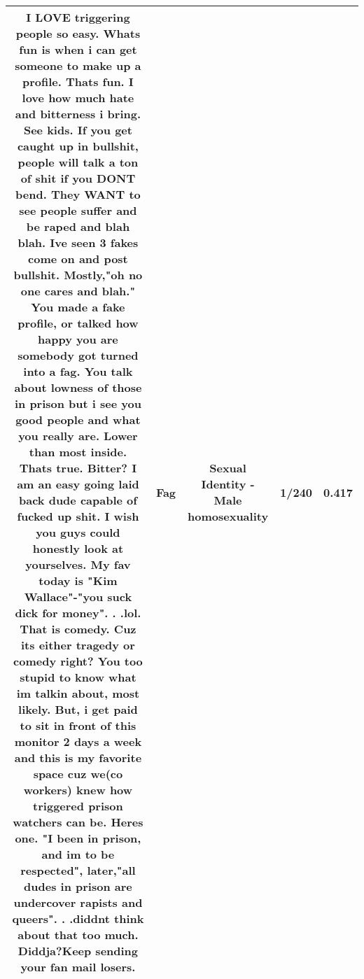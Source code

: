 \documentclass[11pt]{article}
\newlength\mylength
\begin{document}
\begin{center}
\begin{longtable}{|C{.65\mylength}|C{.30\mylength}|C{.12\mylength}|C{.12\mylength}|C{.12\mylength}|}
  \small I LOVE triggering people so easy. Whats fun is when i can get someone to make up a profile. Thats fun. I love how much hate and bitterness i bring. See kids. If you get caught up in bullshit, people will talk a ton of shit if you DONT bend. They WANT to see people suffer and be raped and blah blah. Ive seen 3 fakes come on and post bullshit. Mostly,"oh no one cares and blah." You made a fake profile, or talked how happy you are somebody got turned into a \textbf{fag}. You talk about lowness of those in prison but i see you good people and what you really are. Lower than most inside. Thats true. Bitter? I am an easy going laid back dude capable of fucked up shit. I wish you guys could honestly look at yourselves. My fav today is "Kim Wallace"-"you suck dick for money". . .lol. That is comedy. Cuz its either tragedy or comedy right? You too stupid to know what im talkin about, most likely. But, i get paid to sit in front of this monitor 2 days a week and this is my favorite space cuz we(co workers) knew how triggered prison watchers can be. Heres one. "I been in prison, and im to be respected", later,"all dudes in prison are undercover rapists and queers". . .diddnt think about that too much. Diddja?Keep sending your fan mail losers.\normalsize   & Fag & Sexual Identity - Male homosexuality & 1/240 & 0.417 \\  \hline

\end{longtable}
\end{center}
\end{document}
